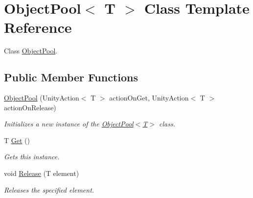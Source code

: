 \hypertarget{class_object_pool}{}\section{Object\+Pool$<$ T $>$ Class Template Reference}
\label{class_object_pool}


Class \hyperlink{class_object_pool}{Object\+Pool}.  


\subsection*{Public Member Functions}
\begin{DoxyCompactItemize}
\item 
\hyperlink{class_object_pool_ac7f7c5e592e12b2b9d7ed59ec64a2d6d}{Object\+Pool} (Unity\+Action$<$ T $>$ action\+On\+Get, Unity\+Action$<$ T $>$ action\+On\+Release)
\begin{DoxyCompactList}\small\item\em Initializes a new instance of the \hyperlink{class_object_pool_ac7f7c5e592e12b2b9d7ed59ec64a2d6d}{Object\+Pool$<$\+T$>$} class. \end{DoxyCompactList}\item 
T \hyperlink{class_object_pool_a28b7e503afcecfb7f8ae7647c7efdff8}{Get} ()
\begin{DoxyCompactList}\small\item\em Gets this instance. \end{DoxyCompactList}\item 
void \hyperlink{class_object_pool_af85041dbe64efa883573f2ad8e24f852}{Release} (T element)
\begin{DoxyCompactList}\small\item\em Releases the specified element. \end{DoxyCompactList}\end{DoxyCompactItemize}
